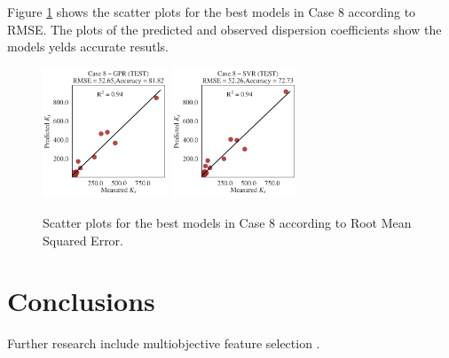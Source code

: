 \documentclass[a4paper,12pt, english]{article}
\begin{document}
Figure \ref{fig:eml____300dpi_scatter_best_model_new___ldc} shows the scatter plots for the best models in Case 8 according to RMSE.
The plots of the predicted and observed dispersion coefficients show the models yelds accurate resutls.

\begin{figure}[!] \centering 
 \includegraphics[width=0.33245\textwidth]{./scatter/eml____300dpi_scatter_best_model___gpr__case_8__test}
 \includegraphics[width=0.33245\textwidth]{./scatter/eml____300dpi_scatter_best_model___svr__case_8__test}
 \caption{\label{fig:eml____300dpi_scatter_best_model_new___ldc}
 Scatter plots for the best models in Case 8 according to Root Mean Squared Error.}
\end{figure}


\section{\label{sec:conclusions} Conclusions}


Further research include multiobjective feature selection \cite{jimenez:2017}.



\end{document}
